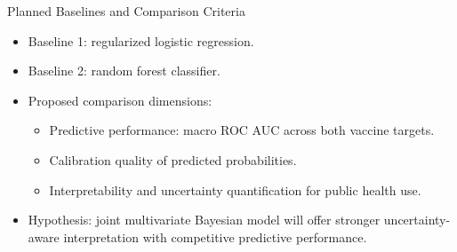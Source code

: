 \begin{frame}{Planned Baselines and Comparison Criteria}
	\begin{itemize}
		\item Baseline 1: regularized logistic regression.
		\item Baseline 2: random forest classifier.
		\item Proposed comparison dimensions:
		\begin{itemize}
			\item Predictive performance: macro ROC AUC across both vaccine targets.
			\item Calibration quality of predicted probabilities.
			\item Interpretability and uncertainty quantification for public health use.
		\end{itemize}
		\item Hypothesis: joint multivariate Bayesian model will offer stronger uncertainty-aware interpretation with competitive predictive performance.
	\end{itemize}
\end{frame}